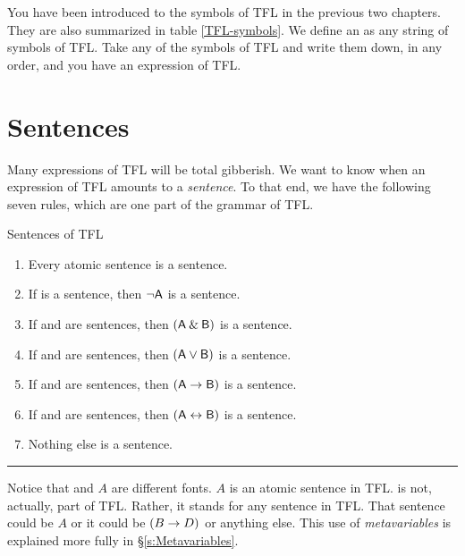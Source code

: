 You have been introduced to the symbols of TFL in the previous two chapters. They are also summarized in table \ref{TFL-symbols}. We define an  as any string of symbols of TFL. Take any of the symbols of TFL and write them down, in any order, and you have an expression of TFL.


\section{Sentences}\label{s:Sentences}
Many expressions of TFL will be total gibberish. We want to know when an expression of TFL amounts to a \emph{sentence}. To that end, we have the following seven rules, which are one part of the grammar of TFL.




\begin{factboxy}{Sentences of TFL}\label{TFLsentences}
	\begin{enumerate}
		\item Every atomic sentence is a sentence.
		\item If  is a sentence, then ${\neg}\mathsf{A}$ is a sentence.
		\item If  and  are sentences, then $(\mathsf{A}\mathbin{\&}\mathsf{B})$ is a sentence.
		\item If  and  are sentences, then $(\mathsf{A}\vee\mathsf{B})$ is a sentence.
		\item If  and  are sentences, then $(\mathsf{A}\rightarrow\mathsf{B})$ is a sentence.
		\item If  and  are sentences, then $(\mathsf{A}\leftrightarrow\mathsf{B})$ is a sentence.
		\item Nothing else is a sentence.
	\end{enumerate}
\hrule
\medskip
\footnotesize{Notice that  and $A$ are different fonts. $A$ is an atomic sentence in TFL.  is not, actually, part of TFL. Rather, it stands for any sentence in TFL. That sentence could be $A$ or it could be $(B \rightarrow D)$ or anything else. This use of \textit{metavariables} is explained more fully in \S\ref{s:Metavariables}.}
\end{factboxy}

